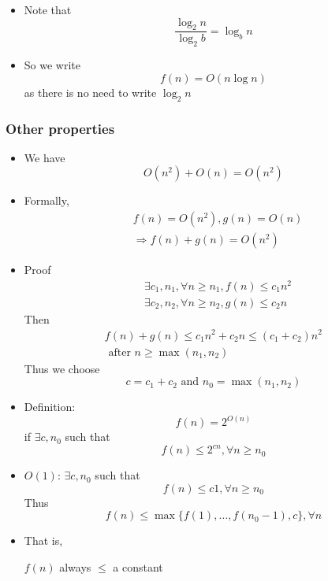 \begin{frame}[allowframebreaks]
\begin{itemize}
\item Note that
  \begin{equation*}
\frac{ \log_2 n }{ \log_2 b}= \log_b n
\end{equation*}
\item So we write
  \begin{equation*}
  f(n)=O(n\log n)
\end{equation*}
as there is no need to write $\log_2 n$
\end{itemize}\end{frame} \begin{frame}[allowframebreaks] \frametitle{Other properties}
  \begin{itemize}
  \item We have
    \begin{equation*}
    O(n^2) + O(n) = O(n^2)
  \end{equation*}
\item Formally,
  \begin{equation*}
    \begin{split}
      & f(n) = O(n^2), g(n) = O(n)\\
      & \Rightarrow f(n) + g(n) = O(n^2)
    \end{split}
  \end{equation*}
\item Proof
  \begin{equation*}
    \begin{split}
      & \exists c_1, n_1, \forall n \geq n_1, f(n) \leq c_1 n^2 \\
      & \exists c_2, n_2, \forall n \geq n_2, g(n) \leq c_2 n
    \end{split}
  \end{equation*}
Then
\begin{gather*}
  f(n) + g(n) \leq c_1 n^2 + c_2 n \leq (c_1+c_2) n^2\\
  \text{ after } n \geq \max (n_1, n_2)
\end{gather*}
Thus we choose
\begin{equation*}
  c = c_1 + c_2 \text{ and } n_0 = \max(n_1, n_2)
\end{equation*}
\item Definition:
  \begin{equation*}
f(n) =  2^{O(n)}
\end{equation*}
if
$\exists c, n_0$ such that
\begin{equation*}
f(n) \leq 2^{cn}, \forall n \geq n_0
\end{equation*}
\item $O(1)$: $\exists c, n_0$ such that 
  \begin{equation*}
f(n)   \leq c 1, \forall n \geq n_0
\end{equation*}
Thus
\begin{equation*}
  f(n) \leq
  \max \{f(1), \ldots, f(n_0-1), c\}, \forall n
\end{equation*}
\item That is,
  \begin{center}
  $f(n)$ always $\leq$ a constant
\end{center}
\end{itemize}\end{frame}



